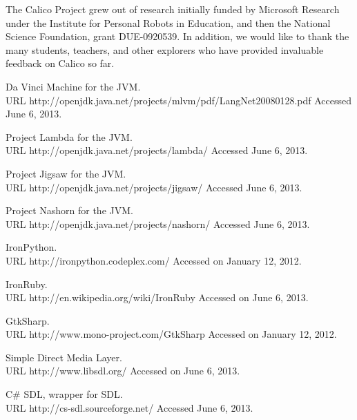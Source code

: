 \documentclass[preprint]{sigplanconf}
\begin{document}

\acks

The Calico Project grew out of research initially funded by Microsoft
Research under the Institute for Personal Robots in Education, and
then the National Science Foundation, grant DUE-0920539. In addition,
we would like to thank the many students, teachers, and other
explorers who have provided invaluable feedback on Calico so far.





\begin{thebibliography}{}
\softraggedright

Da Vinci Machine for the JVM.\\ URL http://openjdk.java.net/projects/mlvm/pdf/LangNet20080128.pdf Accessed June 6, 2013.

Project Lambda for the JVM.\\ URL http://openjdk.java.net/projects/lambda/ Accessed June 6, 2013.

Project Jigsaw for the JVM.\\ URL http://openjdk.java.net/projects/jigsaw/ Accessed June 6, 2013.

Project Nashorn for the JVM.\\ URL http://openjdk.java.net/projects/nashorn/ Accessed June 6, 2013.

IronPython.\\ URL http://ironpython.codeplex.com/ Accessed on January 12, 2012.

IronRuby.\\ URL http://en.wikipedia.org/wiki/IronRuby Accessed on June 6, 2013.

GtkSharp.\\ URL http://www.mono-project.com/GtkSharp Accessed on January 12, 2012.

Simple Direct Media Layer.\\ URL http://www.libsdl.org/ Accessed on June 6, 2013.

C\# SDL, wrapper for SDL.\\ URL http://cs-sdl.sourceforge.net/ Accessed June 6, 2013.


\end{thebibliography}
\end{document}
